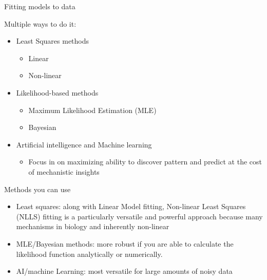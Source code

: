 \documentclass[xcolor=x11names,compress]{beamer}
\renewcommand{\(}{\begin{columns}}
\renewcommand{\)}{\end{columns}}
\newcommand{\<}[1]{\begin{column}{#1}}
\renewcommand{\>}{\end{column}}
\begin{document}
\begin{frame}{Fitting models to data}

Multiple ways to do it:

\begin{itemize}\itemsep10pt

	\item Least Squares methods
	\begin{itemize}
		 \item Linear 
		 \item Non-linear
	\end{itemize}
	\item Likelihood-based methods 
	\begin{itemize}
	 \item Maximum Likelihood Estimation (MLE) 
	 \item Bayesian
	\end{itemize}
	\item Artificial intelligence and Machine learning
	\begin{itemize}
		\item  Focus in on maximizing ability to discover pattern and predict at the cost of mechanistic insights
	\end{itemize}


\end{itemize}

\end{frame}

\begin{frame}{Methods you can use}

\begin{itemize} \itemsep12pt
	
\item Least squares: along with Linear Model fitting, Non-linear Least Squares (NLLS) fitting is a particularly versatile and powerful approach because many mechanisms in biology and inherently non-linear

\item MLE/Bayesian methods: more robust if you are able to calculate the likelihood function analytically or numerically. 

\item AI/machine Learning: most versatile for large amounts of noisy data

\end{itemize}

\end{frame}
\end{document}
